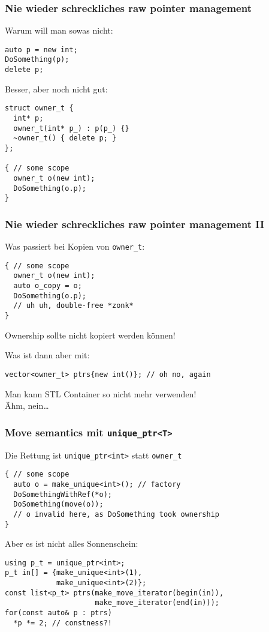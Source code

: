 \documentclass[t,ngerman,usepdftitle=false]{beamer}
\begin{document}
\begin{frame}[fragile]
  \frametitle{Nie wieder schreckliches raw pointer management}
  Warum will man sowas nicht:
  \begin{lstlisting}
auto p = new int;
DoSomething(p);
delete p;
  \end{lstlisting}
  
  \pause Besser, aber noch nicht gut:
  \begin{lstlisting}
struct owner_t {
  int* p;
  owner_t(int* p_) : p(p_) {}
  ~owner_t() { delete p; }    
};  

{ // some scope
  owner_t o(new int);
  DoSomething(o.p);
}
  \end{lstlisting}
  
\end{frame}

\begin{frame}[fragile]
  \frametitle{Nie wieder schreckliches raw pointer management II}
  Was passiert bei Kopien von \lstinline|owner_t|:
  \begin{lstlisting}
{ // some scope
  owner_t o(new int);
  auto o_copy = o;
  DoSomething(o.p);
  // uh uh, double-free *zonk*
}
\end{lstlisting}
\pause
\begin{block}{}
  \centering
  Ownership sollte nicht kopiert werden können!   
\end{block}

\pause
Was ist dann aber mit:
\begin{lstlisting}
vector<owner_t> ptrs{new int()}; // oh no, again
\end{lstlisting}

\pause
\begin{block}{}
  \centering
  Man kann STL Container so nicht mehr verwenden!\\
  {\small Ähm, nein\ldots}   
\end{block}

  
\end{frame}

\begin{frame}[fragile]
  \frametitle{Move semantics mit \lstinline|unique_ptr<T>|}
  Die Rettung ist \lstinline|unique_ptr<int>| statt \lstinline|owner_t|
\begin{lstlisting}
{ // some scope
  auto o = make_unique<int>(); // factory
  DoSomethingWithRef(*o);
  DoSomething(move(o));
  // o invalid here, as DoSomething took ownership
}
\end{lstlisting}

\pause
Aber es ist nicht alles Sonnenschein:
\begin{lstlisting}
using p_t = unique_ptr<int>;
p_t in[] = {make_unique<int>(1),
            make_unique<int>(2)};
const list<p_t> ptrs(make_move_iterator(begin(in)),
                     make_move_iterator(end(in)));
for(const auto& p : ptrs)
  *p *= 2; // constness?! 
\end{lstlisting} 
  
  
\end{frame}
\end{document}
